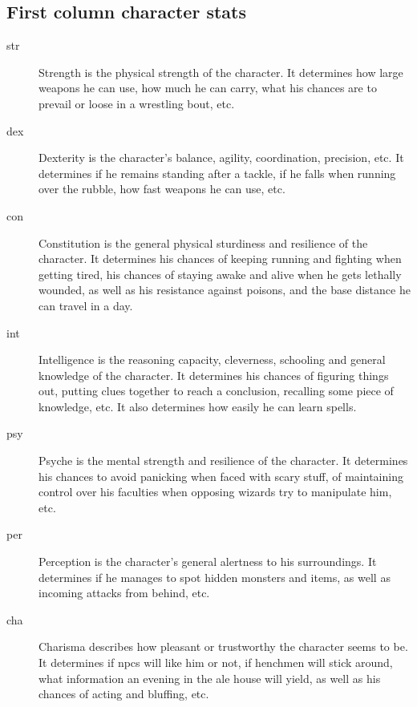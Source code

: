 \subsection*{First column character stats}
\begin{description}

\item[str] Strength is the physical strength of the character. It determines how large weapons he can use, how much he can carry, what his chances are to prevail or loose in a wrestling bout, etc.

\item[dex] Dexterity is the character's balance, agility, coordination, precision, etc. It determines if he remains standing after a tackle, if he falls when running over the rubble, how fast weapons he can use, etc.

\item[con] Constitution is the general physical sturdiness and resilience of the character. It determines his chances of keeping running and fighting when getting tired, his chances of staying awake and alive when he gets lethally wounded, as well as his resistance against poisons, and the base distance he can travel in a day.

\item[int] Intelligence is the reasoning capacity, cleverness, schooling and general knowledge of the character. It determines his chances of figuring things out, putting clues together to reach a conclusion, recalling some piece of knowledge, etc. It also determines how easily he can learn spells.

\item[psy] Psyche is the mental strength and resilience of the character. It determines his chances to avoid panicking when faced with scary stuff, of maintaining control over his faculties when opposing wizards try to manipulate him, etc.

\item[per] Perception is the character's general alertness to his surroundings. It determines if he manages to spot hidden monsters and items, as well as incoming attacks from behind, etc.

\item[cha] Charisma describes how pleasant or trustworthy the character seems to be. It determines if npcs will like him or not, if henchmen will stick around, what information an evening in the ale house will yield, as well as his chances of acting and bluffing, etc.

\end{description}


